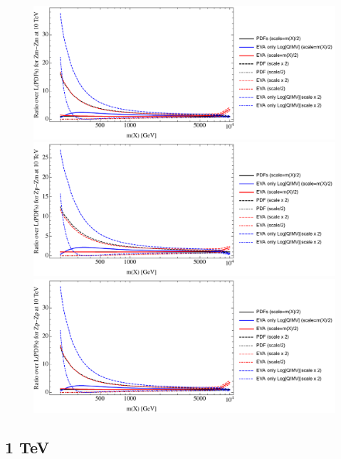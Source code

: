 \documentclass[a4paper,11pt]{article}
\begin{document}
\begin{figure}[ht]
\includegraphics[width=0.4\linewidth]{PlotLumi/10TeV/ratios/Zm-Zm.pdf}
\includegraphics[width=0.4\linewidth]{PlotLumi/10TeV/ratios/Zp-Zm.pdf}
\includegraphics[width=0.4\linewidth]{PlotLumi/10TeV/ratios/Zp-Zp.pdf}
\end{figure}

%
%
%
\clearpage
\subsection{1 TeV}
\end{document}

